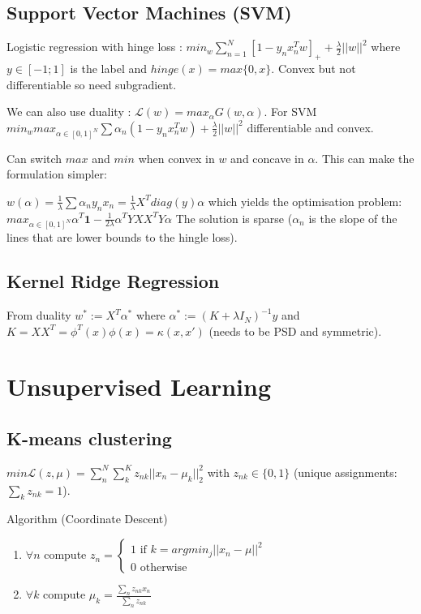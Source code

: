 \subsection{Support Vector Machines (SVM)}
Logistic regression with hinge loss :
$min_w \sum_{n=1}^N [1-y_n x_n^T w]_+ + \frac{\lambda}{2} ||w||^2$ where $y \in [-1;1]$ is the label and $hinge(x)= max\{0,x\}$. Convex but not differentiable so need subgradient.

We can also use duality : $\mathcal{L}(w) = max_{\alpha} G(w, \alpha)$. For SVM
$min_{w} max_{\alpha \in [0,1]^N} \sum \alpha_n (1 - y_nx_n^Tw) + \frac{\lambda}{2} ||w||^2$ differentiable and convex.

Can switch $max$ and $min$ when convex in $w$ and concave in $\alpha$. This can make the formulation simpler:

$w(\alpha) = \frac{1}{\lambda} \sum \alpha_n y_n x_n = \frac{1}{\lambda} X^T diag(y) \alpha$ which yields the optimisation problem:
$max_{\alpha \in [0,1]^N} \alpha^T\mathbf{1} - \frac{1}{2\lambda} \alpha^T Y X X^T Y \alpha$
The solution is sparse ($\alpha_n$ is the slope of the lines that are lower bounds to the hingle loss).

\subsection{Kernel Ridge Regression}
From duality $w^* := X^T \alpha^*$ where $\alpha^* := (K + \lambda I_N)^{-1}y$ and $K=XX^T = \phi^T(x) \phi(x) = \kappa(x,x')$ (needs to be PSD and symmetric).


\section{Unsupervised Learning}
\subsection{K-means clustering}

$min \mathcal{L}(z,\mu) = \sum_n^N \sum_k^K z_{nk} ||x_n - \mu_k||^2_2$ with $z_{nk} \in \{0,1\}$ (unique assignments: $\sum_k z_{nk} = 1$).

Algorithm (Coordinate Descent)
\begin{enumerate}
\item $\forall n$ compute $z_n = \begin{cases} 
	1 \text{ if } k = argmin_j || x_n - \mu||^2 \\
	0 \text{ otherwise }
   \end{cases}$
\item $\forall k$ compute $\mu_k = \frac{\sum_n z_{nk} x_n}{\sum_n z_{nk}}$
\end{enumerate}

